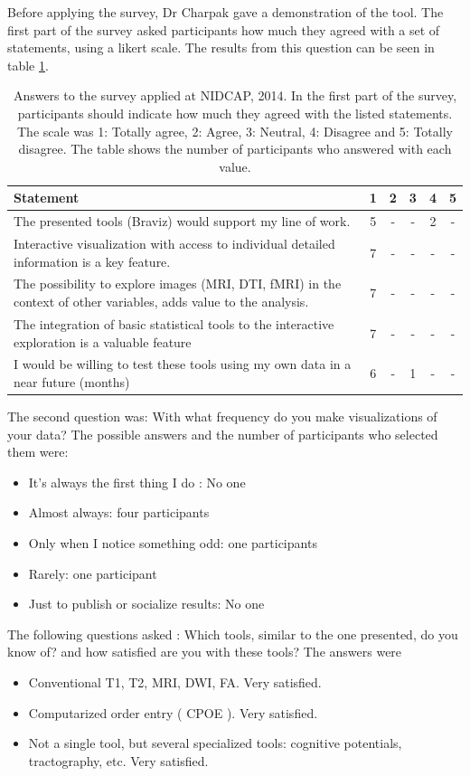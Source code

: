 Before applying the survey, Dr Charpak gave a demonstration of the tool. The first part of the survey asked participants how much they agreed with a set of statements, using a likert scale. The results from this question can be seen in table \ref{tab_nidcap_likert}. 

\begin{table}
	\centering
		\begin{tabular}{p{}ccccc}
			\toprule
			Statement&1&2&3&4&5 \\
			\midrule
			The presented tools (Braviz) would support my line of work. & 5 &-&-& 2 &- \\
			Interactive visualization with access to individual detailed information is a key feature. &7&-&-&-&- \\			
			The possibility to explore images (MRI, DTI, fMRI) in the context of other variables, adds value to the analysis. &7&-&-&-&- \\
			The integration of basic statistical tools to the interactive exploration is a valuable feature &7&-&-&-&- \\
			I would be willing to test these tools using my own data in a near future (months) & 6 &-& 1 &-&- \\
			\bottomrule
		\end{tabular}
	\caption{Answers to the survey applied at NIDCAP, 2014. In the first part of the survey, participants should indicate how much they agreed with the listed statements. The scale was
	1: Totally agree, 2: Agree, 3: Neutral, 4: Disagree and 5: Totally disagree. The table shows the number of participants who answered with each value.}
	\label{tab_nidcap_likert}
\end{table}

The second question was: With what frequency do you make visualizations of your data? The possible answers and the number of participants who selected them were:

\begin{itemize}
	\item It's always the first thing I do : No one
	\item Almost always: four participants
	\item Only when I notice something odd: one participants
	\item Rarely: one participant
	\item Just to publish or socialize results: No one
\end{itemize}

The following questions asked : Which tools, similar to the one presented, do you know of? and how satisfied are you with these tools? The answers were 
\begin{itemize}
	\item Conventional T1, T2, MRI, DWI, FA. Very satisfied.
	\item Computarized order entry ( CPOE ). Very satisfied.
	\item Not a single tool, but several specialized tools: cognitive potentials, tractography, etc. Very satisfied.
\end{itemize}

